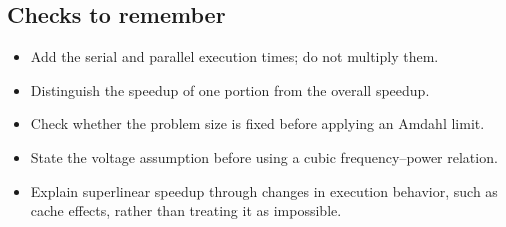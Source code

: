 \documentclass[11pt,a4paper]{article}
\begin{document}
\subsection{Checks to remember}
\begin{itemize}
  \item Add the serial and parallel execution times; do not multiply them.
  \item Distinguish the speedup of one portion from the overall speedup.
  \item Check whether the problem size is fixed before applying an Amdahl limit.
  \item State the voltage assumption before using a cubic frequency--power relation.
  \item Explain superlinear speedup through changes in execution behavior,
        such as cache effects, rather than treating it as impossible.
\end{itemize}
\end{document}
